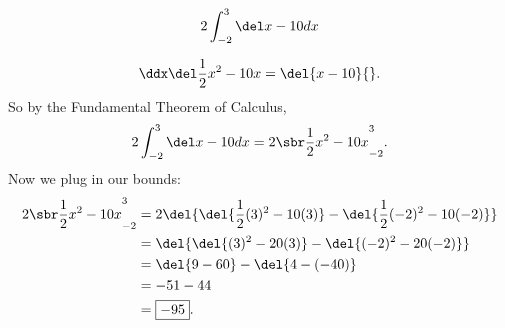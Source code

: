 \renewcommand{\avibounds}{_{-2}^3}
\renewcommand{\avifn}{\del{x-10}}
\renewcommand{\avianti}{\frac{1}{2}x^2 - 10x}
\renewcommand{\aviconstant}{2}

\begin{probboxed}
    \[
        \aviprob{}
    \]
\end{probboxed}

\aviinversepowerrule
\[
    \ddx\del\avianti{} = \avifn{}.
\]
So by the Fundamental Theorem of Calculus,
\[
    \aviprob{}
    = \avibounded{}.
\]
Now we plug in our bounds:
\begin{align*}
    \avibounded{}
    &= 2\del{\del{\frac{1}{2}(3)^2 - 10(3)} - \del{\frac{1}{2}(-2)^2 - 10(-2)}} \\
    &= \del{\del{(3)^2 - 20(3)} - \del{(-2)^2 - 20(-2)}} \\
    &= \del{9 - 60} - \del{4 - (-40)} \\
    &= -51 - 44 \\
    &= \boxed{-95}.
\end{align*}
